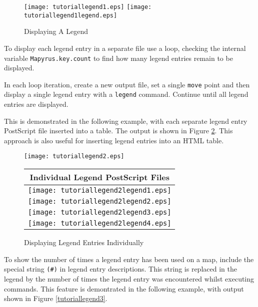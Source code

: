 

\begin{figure}[htb]
\texttt{[image: tutoriallegend1.eps]}
\texttt{[image: tutoriallegend1legend.eps]}
\caption{Displaying A Legend}
\label{tutoriallegend1}
\end{figure}

To display each legend entry in a separate file use a loop, checking the
internal variable \texttt{Mapyrus.key.count} to find how many legend entries
remain to be displayed.

In each loop iteration, create a new output file, set a single \texttt{move}
point and then display a single legend entry with a \texttt{legend} command.
Continue until all legend entries are displayed.

This is demonstrated in the following example, with each separate legend entry
PostScript file inserted into a table.  The output is shown in Figure
\ref{tutoriallegend2}.  This approach is also useful for inserting legend
entries into an HTML table.



\begin{figure}[htb]
\texttt{[image: tutoriallegend2.eps]}

\begin{tabular}{|c|}
\hline
Individual Legend PostScript Files \\
\hline
\texttt{[image: tutoriallegend2legend1.eps]} \\
\hline
\texttt{[image: tutoriallegend2legend2.eps]} \\
\hline
\texttt{[image: tutoriallegend2legend3.eps]} \\
\hline
\texttt{[image: tutoriallegend2legend4.eps]} \\
\hline
\end{tabular}

\caption{Displaying Legend Entries Individually}
\label{tutoriallegend2}
\end{figure}

To show the number of times a legend entry has been used on
a map, include the special string \texttt{(\#)} in legend entry descriptions.
This string is replaced in the legend by the number of times the legend entry
was encountered whilst executing commands.
This feature is demontrated in the following example,
with output shown in 
Figure \ref{tutoriallegend3}.



